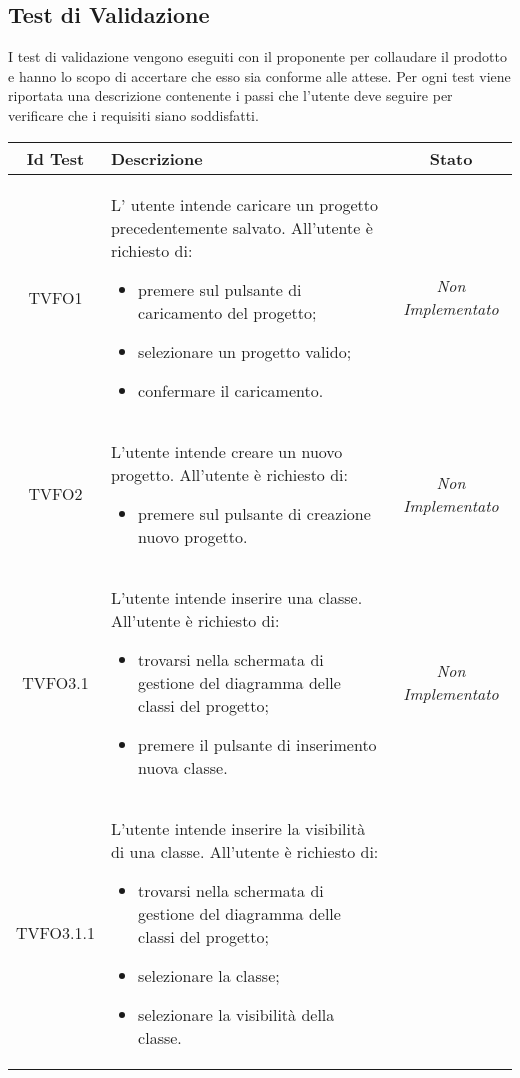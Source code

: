 \subsection{Test di Validazione}
I test di validazione vengono eseguiti con il proponente per collaudare il prodotto e hanno lo scopo di accertare che esso sia conforme alle attese. Per ogni test viene riportata una descrizione contenente i passi che l'utente deve seguire per verificare che i requisiti siano soddisfatti.

\normalsize
\begin{longtable}{|c|>{}m{8cm}|c|}
\hline 
\textbf{Id Test} & \textbf{Descrizione} & \textbf{Stato}\\
\hline
\endhead
\hypertarget{TVFO1}{TVFO1} & L' utente intende caricare un progetto precedentemente salvato. All'utente è richiesto di:
\begin{itemize}
\item premere sul pulsante di caricamento del progetto;
\item selezionare un progetto valido;
\item confermare il caricamento.
\end{itemize}
 & \textit{Non Implementato}\\ \hline
\hypertarget{TVFO2}{TVFO2} & L'utente intende creare un  nuovo progetto.
All'utente è richiesto di:
\begin{itemize}
\item premere sul pulsante di creazione nuovo progetto.
\end{itemize} & \textit{Non Implementato}\\ \hline
\hypertarget{TVFO3.1}{TVFO3.1} & L'utente intende inserire una classe.
All'utente è richiesto di:
\begin{itemize}
\item trovarsi nella schermata di gestione del diagramma delle classi del progetto;
\item premere il pulsante di inserimento nuova classe.
\end{itemize} & \textit{Non Implementato}\\ \hline
\hypertarget{TVFO3.1.1}{TVFO3.1.1} & L'utente intende inserire la visibilità di una classe.
All'utente è richiesto di:
\begin{itemize}
\item trovarsi nella schermata di gestione del diagramma delle classi del progetto;
\item selezionare la classe;
\item selezionare la visibilità della classe.

\end{itemize}
\end{longtable}
